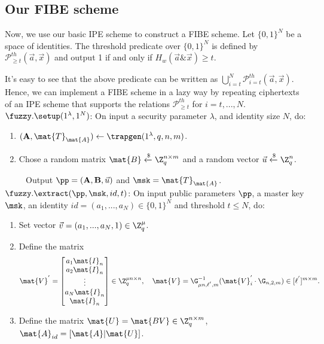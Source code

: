 \documentclass[11pt,hidelinks]{article}
\begin{document}
\begin{appendix}
\subsection{Our FIBE scheme}
Now, we use our basic IPE scheme to construct a FIBE scheme. Let $\{0,1\}^{N}$ be a space of identities. The threshold predicate over $\{0,1\}^{N}$ is defined by $\mathcal{P}^{th}_{\geq t}(\vec{a}, \vec{x})$ and output 1 if and only if $H_{w}(\vec{a} \& \vec{x}) \geq t$.\

It's easy to see that the above predicate can be written as $\bigcup^{N}_{i=t}\mathcal{P}^{th}_{i=t}(\vec{a}, \vec{x})$. Hence, we can implement a FIBE scheme in a lazy way by repeating ciphertexts of an IPE scheme that supports the relations $\mathcal{P}^{th}_{\geq t}$ for $i=t,...,N$.\\[0.4cm]
$\fuzzy.\setup(1^{\lambda}, 1^{N})$: On input a security parameter $\lambda$, and identity size $N$, do:
\begin{enumerate}
\item $(\textbf{A}, \mat{T}_\mat{A})\leftarrow \trapgen(1^{\lambda}, q, n, m)$.
\item Chose a random matrix $\mat{B}\xleftarrow{\$} \Z^{n \times m}_{q}$ and a random vector $\vec{u}\xleftarrow{\$} \Z^{n}_{q}$.
\end{enumerate}
~~~~~Output $\pp=(\textbf{A}, \textbf{B}, \vec{u})$ and $\msk= \mat{T}_\mat{A}$.\\[0.4cm]
$\fuzzy.\extract(\pp, \msk, id, t)$: On input public parameters $\pp$, a master key $\msk$, an identity $id= (a_{1},...,a_{N}) \in \{0,1\}^{N}$ and threshold $t \leq N$, do:
\begin{enumerate}
\item Set vector $\vec{v}=(a_{1},...,a_{N},1) \in \Z^{\mu}_{q}$.
\item Define the matrix
\begin{equation}
 \mat{V}^{'}= \begin{bmatrix}
a_{1} \mat{I}_{n}\\
a_{2} \mat{I}_{n}\\
\vdots\\
a_{N} \mat{I}_{n}\\
\mat{I}_{n}
\end{bmatrix} \in \Z^{\mu n \times n}_{q},~~~ \mat{V}=\G^{-1}_{\mu n,\ell^{'},m}(\mat{V}^{'}_{i}\cdot \G_{n,2,m}) \in [\ell^{'}]^{m \times m}.
\end{equation}
\item Define the  matrix $\mat{U}=\mat{BV} \in \Z^{n \times m}_{q}$, $\mat{A}_{id}=[\mat{A}|\mat{U}]$.

\end{enumerate}
\end{appendix}
\end{document}

